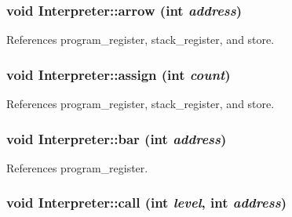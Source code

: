 \hypertarget{classInterpreter_a0301b087eed7addc3046b47c4438825d}{
\subsubsection[{arrow}]{\setlength{\rightskip}{0pt plus 5cm}void Interpreter::arrow (int {\em address})}}
\label{classInterpreter_a0301b087eed7addc3046b47c4438825d}


References program\_\-register, stack\_\-register, and store.

\hypertarget{classInterpreter_a19687bebaa308803b02e12239c0b812c}{
\subsubsection[{assign}]{\setlength{\rightskip}{0pt plus 5cm}void Interpreter::assign (int {\em count})}}
\label{classInterpreter_a19687bebaa308803b02e12239c0b812c}


References program\_\-register, stack\_\-register, and store.

\hypertarget{classInterpreter_aa29dee87877a4d5017642cfed6d14322}{
\subsubsection[{bar}]{\setlength{\rightskip}{0pt plus 5cm}void Interpreter::bar (int {\em address})}}
\label{classInterpreter_aa29dee87877a4d5017642cfed6d14322}


References program\_\-register.

\hypertarget{classInterpreter_ae8da184101a719f601e7d46c4920225f}{
\subsubsection[{call}]{\setlength{\rightskip}{0pt plus 5cm}void Interpreter::call (int {\em level}, \/  int {\em address})}}
\label{classInterpreter_ae8da184101a719f601e7d46c4920225f}


